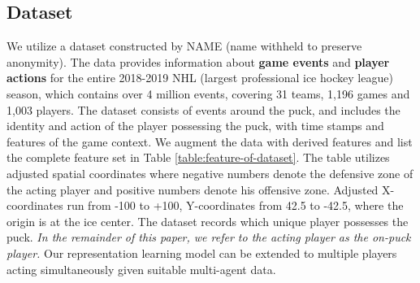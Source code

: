 \documentclass{article}
\begin{document}
\subsection{Dataset}
We utilize a dataset constructed by NAME (name withheld to preserve anonymity).
The data provides information about \textbf{game events} and \textbf{player actions} for the entire 2018-2019 NHL (largest professional ice hockey league) season,
which contains over 4 million events, covering 31 teams, 1,196 games and 1,003 players. 
The dataset consists of events around the puck, and includes the identity and action of the player possessing the puck, with time stamps and features of the game context. 
We augment the data with derived features and list the complete feature set in Table \ref{table:feature-of-dataset}.
The table utilizes adjusted spatial coordinates where negative numbers denote the defensive zone of the acting player and positive numbers denote his offensive zone. Adjusted X-coordinates run from -100 to +100, Y-coordinates from 42.5 to -42.5, where the origin is at the ice center. The dataset records which unique player possesses the puck. {\em In the remainder of this paper, we refer to the acting player as the on-puck player.}
Our representation learning model can be extended to multiple players acting simultaneously given suitable multi-agent data.
\end{document}
